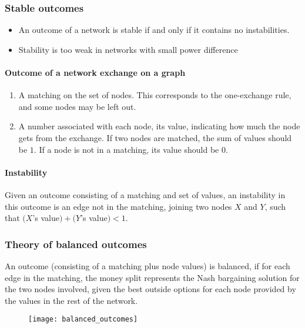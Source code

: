 \subsubsection{Stable outcomes}

\begin{itemize}
\item An outcome of a network is stable if and only if it contains no instabilities.
\item Stability is too weak in networks with small power difference
\end{itemize}

\paragraph{Outcome of a network exchange on a graph}

\begin{enumerate}
\item A matching on the set of nodes. This corresponds to the one-exchange rule, and some nodes may be left out.
\item A number associated with each node, its value, indicating how much the node gets from the exchange. If two nodes are matched, the sum of values should be $1$. If a node is not in a matching, its value should be $0$.
\end{enumerate}

\paragraph{Instability}

Given an outcome consisting of a matching and set of values, an instability in this outcome is an edge not in the matching, joining two nodes $X$ and $Y$, such that $(X$’s value$) + (Y$’s value$) < 1$.

\subsubsection{Theory of balanced outcomes}

\begin{formal}
An outcome (consisting of a matching plus node values) is balanced, if for each edge in the matching, the money split represents the Nash bargaining solution for the two nodes involved, given the best outside options for each node provided by the values in the rest of the network.
\end{formal}

\begin{figure}[H]
    \centering
    \texttt{[image: balanced\_outcomes]}
\end{figure}

